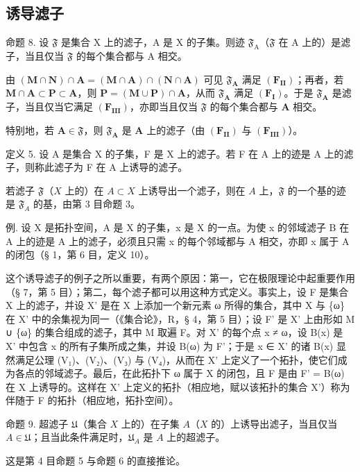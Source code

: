 \subsection{诱导滤子}

命题 8. 设 \(\mathfrak{F}\) 是集合 X 上的滤子，A 是 X 的子集。则迹 \(\mathfrak{F}_{\mathrm{A}}\)（\(\mathfrak{F}\) 在 A 上的）是滤子，当且仅当 \(\mathfrak{F}\) 的每个集合都与 A 相交。

由 \((\mathbf{M} \cap \mathbf{N}) \cap \mathbf{A} = (\mathbf{M} \cap \mathbf{A}) \cap (\mathbf{N} \cap \mathbf{A})\) 可见 \(\mathfrak{F}_{\mathbf{A}}\) 满足 \((\mathbf{F}_{\mathbf{II}})\)；再者，若 \(\mathbf{M} \cap \mathbf{A} \subset \mathbf{P} \subset \mathbf{A}\)，则 \(\mathbf{P} = (\mathbf{M} \cup \mathbf{P}) \cap \mathbf{A}\)，从而 \(\mathfrak{F}_{\mathbf{A}}\) 满足 \((\mathbf{F}_{\mathbf{I}})\)。于是 \(\mathfrak{F}_{\mathbf{A}}\) 是滤子，当且仅当它满足 \((\mathbf{F}_{\mathbf{III}})\)，亦即当且仅当 \(\mathfrak{F}\) 的每个集合都与 \(\mathbf{A}\) 相交。

特别地，若 \(\mathbf{A} \in \mathfrak{F}\)，则 \(\mathfrak{F}_{\mathbf{A}}\) 是 \(\mathbf{A}\) 上的滤子（由 \((\mathbf{F}_{\mathbf{II}})\) 与 \((\mathbf{F}_{\mathbf{III}})\)）。

定义 5. 设 A 是集合 X 的子集，F 是 X 上的滤子。若 F 在 A 上的迹是 A 上的滤子，则称此滤子为 F 在 A 上诱导的滤子。

若滤子 \(\mathfrak{F}\)（\(X\) 上的）在 \(A \subset X\) 上诱导出一个滤子，则在 \(A\) 上，\(\mathfrak{F}\) 的一个基的迹是 \(\mathfrak{F}_A\) 的基，由第 3 目命题 3。

例. 设 X 是拓扑空间，A 是 X 的子集，x 是 X 的一点。为使 x 的邻域滤子 B 在 A 上的迹是 A 上的滤子，必须且只需 x 的每个邻域都与 A 相交，亦即 x 属于 A 的闭包（§ 1，第 6 目，定义 10）。

这个诱导滤子的例子之所以重要，有两个原因：第一，它在极限理论中起重要作用（§ 7，第 5 目）；第二，每个滤子都可以用这种方式定义。事实上，设 F 是集合 X 上的滤子，并设 X' 是在 X 上添加一个新元素 ω 所得的集合，其中 X 与 \{ω\} 在 X' 中的余集视为同一（《集合论》，R，§ 4，第 5 目）；设 F' 是 X' 上由形如 M ∪ \{ω\} 的集合组成的滤子，其中 M 取遍 F。对 X' 的每个点 x ≠ ω，设 B(x) 是 X' 中包含 x 的所有子集所成之集，并设 B(ω) 为 F'；于是 x ∈ X' 的诸 B(x) 显然满足公理 (V₁)、(V₂)、(V₃) 与 (V₄)，从而在 X' 上定义了一个拓扑，使它们成为各点的邻域滤子。最后，在此拓扑下 ω 属于 X 的闭包，且 F 是由 F' = B(ω) 在 X 上诱导的。这样在 X' 上定义的拓扑（相应地，赋以该拓扑的集合 X'）称为伴随于 F 的拓扑（相应地，拓扑空间）。

命题 9. 超滤子 \(\mathfrak{U}\)（集合 \(X\) 上的）在子集 \(A\)（\(X\) 的）上诱导出滤子，当且仅当 \(A \in \mathfrak{U}\)；且当此条件满足时，\(\mathfrak{U}_A\) 是 \(A\) 上的超滤子。

这是第 4 目命题 5 与命题 6 的直接推论。

